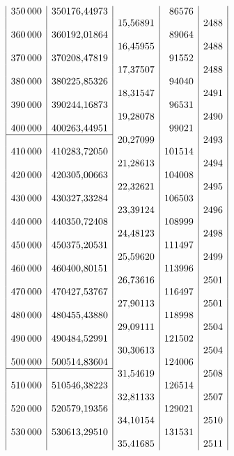 {\[\begin{array}{|r|r|r|r|r|}
350\,000&350176{,}44973&&86576&\\
&&15{,}56891&&2488\\
360\,000&360192{,}01864&&89064&\\
&&16{,}45955&&2488\\
370\,000&370208{,}47819&&91552&\\
&&17{,}37507&&2488\\
380\,000&380225{,}85326&&94040&\\
&&18{,}31547&&2491\\
390\,000&390244{,}16873&&96531&\\
&&19{,}28078&&2490\\
400\,000&400263{,}44951&&99021&\\
\cline{1-2}
&&20{,}27099&&2493\\
410\,000&410283{,}72050&&101514&\\
&&21{,}28613&&2494\\
420\,000&420305{,}00663&&104008&\\
&&22{,}32621&&2495\\
430\,000&430327{,}33284&&106503&\\
&&23{,}39124&&2496\\
440\,000&440350{,}72408&&108999&\\
&&24{,}48123&&2498\\
450\,000&450375{,}20531&&111497&\\
&&25{,}59620&&2499\\
460\,000&460400{,}80151&&113996&\\
&&26{,}73616&&2501\\
470\,000&470427{,}53767&&116497&\\
&&27{,}90113&&2501\\
480\,000&480455{,}43880&&118998&\\
&&29{,}09111&&2504\\
490\,000&490484{,}52991&&121502&\\
&&30{,}30613&&2504\\
500\,000&500514{,}83604&&124006&\\
\cline{1-2}
&&31{,}54619&&2508\\
510\,000&510546{,}38223&&126514&\\
&&32{,}81133&&2507\\
520\,000&520579{,}19356&&129021&\\
&&34{,}10154&&2510\\
530\,000&530613{,}29510&&131531&\\
&&35{,}41685&&2511\\

\end{array}\]}
